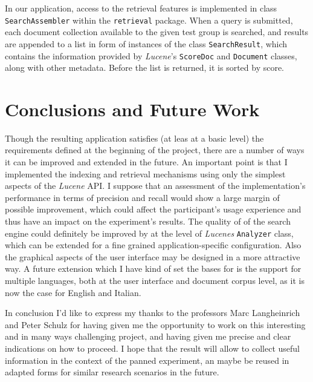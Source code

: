 \documentclass[a4paper]{usiinfbachelorproject}
\begin{document}
In our application, access to the retrieval features is implemented in class \texttt{SearchAssembler} within the \texttt{retrieval} package.
When a query is submitted, each document collection available to the given test group is searched, and results are appended to a
list in form of instances of the class \texttt{SearchResult}, which contains the information provided by \emph{Lucene}'s 
\texttt{ScoreDoc} and \texttt{Document} classes, along with other metadata. Before the list is returned, it is sorted
by score.

\newpage

\section{\textbf{Conclusions and Future Work}} \label{sec:futureWork}

Though the resulting application satisfies (at leas at a basic level) the requirements defined at the
 beginning of the project, there are a number of ways it can be improved and extended in the future. An important
point is that I implemented the indexing and retrieval mechanisms using only the simplest aspects of the
\emph{Lucene} API. I suppose that an assessment of the implementation's performance in terms of
precision and recall would show a large margin of possible improvement, which could affect the participant's 
usage experience and thus have an impact on the experiment's results. The quality of of the search engine could
definitely be improved by at the level of \emph{Lucenes} \texttt{Analyzer} class, which can be extended for
a fine grained application-specific configuration. Also the graphical aspects of the user interface may be
designed in a more attractive way.
A future extension which I have kind of set the bases for is the support for multiple languages, both at the
user interface and document corpus level, as it is now the case for English and Italian.

In conclusion I'd like to express my thanks to the professors Marc Langheinrich and Peter Schulz
for having given me the opportunity to work on this interesting and in many ways challenging project, 
and having given me precise and clear indications on how to proceed.
I hope that the result will allow to collect useful information in the context of the panned experiment,
an maybe be reused in adapted forms for similar research scenarios in the future.
\end{document}
